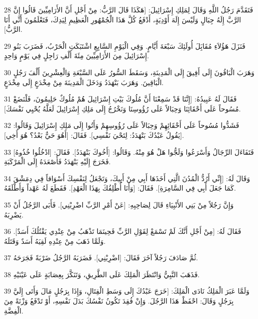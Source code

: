 \par 28 فَتَقَدَّمَ رَجُلُ اللَّهِ وَقَالَ لِمَلِكِ إِسْرَائِيلَ: [هَكَذَا قَالَ الرَّبُّ: مِنْ أَجْلِ أَنَّ الأَرَامِيِّينَ قَالُوا إِنَّ الرَّبَّ إِلَهُ جِبَالٍ وَلَيْسَ إِلَهَ أَوْدِيَةٍ، أَدْفَعُ كُلَّ هَذَا الْجُمْهُورِ الْعَظِيمِ لِيَدِكَ، فَتَعْلَمُونَ أَنِّي أَنَا الرَّبُّ].
\par 29 فَنَزَلَ هَؤُلاَءِ مُقَابَِلَ أُولَئِكَ سَبْعَةَ أَيَّامٍ. وَفِي الْيَوْمِ السَّابِعِ اشْتَبَكَتِ الْحَرْبُ، فَضَرَبَ بَنُو إِسْرَائِيلَ مِنَ الأَرَامِيِّينَ مِئَةَ أَلْفِ رَاجِلٍ فِي يَوْمٍ وَاحِدٍ.
\par 30 وَهَرَبَ الْبَاقُونَ إِلَى أَفِيقَ إِلَى الْمَدِينَةِ، وَسَقَطَ السُّورُ عَلَى السَّبْعَةِ وَالْعِشْرِينَ أَلْفَ رَجُلٍ الْبَاقِينَ. وَهَرَبَ بَنْهَدَدُ وَدَخَلَ الْمَدِينَةَ مِنْ مِخْدَعٍ إِلَى مِخْدَعٍ.
\par 31 فَقَالَ لَهُ عَبِيدُهُ: [إِنَّنَا قَدْ سَمِعْنَا أَنَّ مُلُوكَ بَيْتِ إِسْرَائِيلَ هُمْ مُلُوكٌ حَلِيمُونَ، فَلْنَضَعْ مُسُوحاً عَلَى أَحْقَائِنَا وَحِبَالاً عَلَى رُؤُوسِنَا وَنَخْرُجُ إِلَى مَلِكِ إِسْرَائِيلَ لَعَلَّهُ يُحْيِي نَفْسَكَ].
\par 32 فَشَدُّوا مُسُوحاً عَلَى أَحْقَائِهِمْ وَحِبَالاً عَلَى رُؤُوسِهِمْ وَأَتُوا إِلَى مَلِكِ إِسْرَائِيلَ وَقَالُوا: [يَقُولُ عَبْدُكَ بَنْهَدَدُ: لِتَحْيَ نَفْسِي]. فَقَالَ: [أَهُوَ حَيٌّ بَعْدُ؟ هُوَ أَخِي].
\par 33 فَتَفَاءَلَ الرِّجَالُ وَأَسْرَعُوا وَلَجُّوا هَلْ هُوَ مِنْهُ. وَقَالُوا: [أَخُوكَ بَنْهَدَدُ]. فَقَالَ: [ادْخُلُوا خُذُوهُ] فَخَرَجَ إِلَيْهِ بَنْهَدَدُ فَأَصْعَدَهُ إِلَى الْمَرْكَبَةِ.
\par 34 وَقَالَ لَهُ: [إِنِّي أَرُدُّ الْمُدُنَ الَّتِي أَخَذَهَا أَبِي مِنْ أَبِيكَ، وَتَجْعَلُ لِنَفْسِكَ أَسْوَاقاً فِي دِمَشْقَ كَمَا جَعَلَ أَبِي فِي السَّامِرَةِ]. فَقَالَ: [وَأَنَا أُطْلِقُكَ بِهَذَا الْعَهْدِ]. فَقَطَعَ لَهُ عَهْداً وَأَطْلَقَهُ.
\par 35 وَإِنَّ رَجُلاً مِنْ بَنِي الأَنْبِيَاءِ قَالَ لِصَاحِبِهِ: [عَنْ أَمْرِ الرَّبِّ اضْرِبْنِي]. فَأَبَى الرَّجُلُ أَنْ يَضْرِبَهُ.
\par 36 فَقَالَ لَهُ: [مِنْ أَجْلِ أَنَّكَ لَمْ تَسْمَعْ لِقَوْلِ الرَّبِّ فَحِينَمَا تَذْهَبُ مِنْ عِنْدِي يَقْتُلُكَ أَسَدٌ]. وَلَمَّا ذَهَبَ مِنْ عِنْدِهِ لَقِيَهُ أَسَدٌ وَقَتَلَهُ.
\par 37 ثُمَّ صَادَفَ رَجُلاً آخَرَ فَقَالَ: [اضْرِبْنِي]. فَضَرَبَهُ الرَّجُلُ ضَرْبَةً فَجَرَحَهُ.
\par 38 فَذَهَبَ النَّبِيُّ وَانْتَظَرَ الْمَلِكَ عَلَى الطَّرِيقِ، وَتَنَكَّرَ بِعِصَابَةٍ عَلَى عَيْنَيْهِ.
\par 39 وَلَمَّا عَبَرَ الْمَلِكُ نَادَى الْمَلِكَ: [خَرَجَ عَبْدُكَ إِلَى وَسَطِ الْقِتَالِ، وَإِذَا بِرَجُلٍ مَالَ وَأَتَى إِلَيَّ بِرَجُلٍ وَقَالَ: احْفَظْ هَذَا الرَّجُلَ. وَإِنْ فُقِدَ تَكُونُ نَفْسُكَ بَدَلَ نَفْسِهِ، أَوْ تَدْفَعُ وَزْنَةً مِنَ الْفِضَّةِ.
